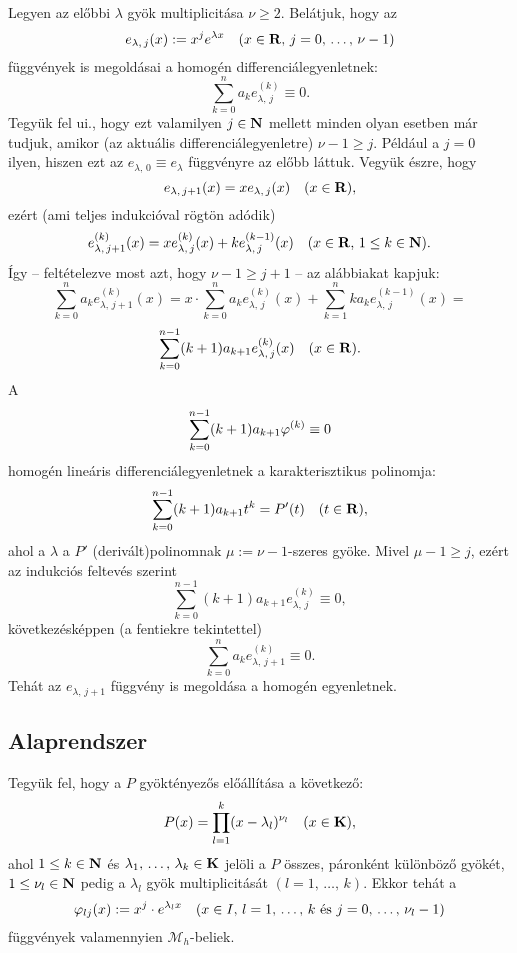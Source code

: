 Legyen az előbbi $\lambda$ gyök multiplicitása $\nu \geq 2$. Belátjuk, hogy az
\[
	e_{\lambda, \, j}(x) := x^j e^{\lambda x} \quad (x \in \mathbf{R}, \, j = 0, \, \dots, \, \nu - 1)
\]
függvények is megoldásai a homogén differenciálegyenletnek:
\[
	\sum_{k=0}^n a_k e_{\lambda, \, j}^{(k)} \equiv 0.
\]
Tegyük fel ui., hogy ezt valamilyen $j \in \mathbf{N}$ mellett minden olyan esetben már tudjuk, amikor (az aktuális differenciálegyenletre) $\nu - 1 \geq j$. Például a $j=0$ ilyen, hiszen ezt az $e_{\lambda, \, 0} \equiv e_\lambda$ függvényre az előbb láttuk. Vegyük észre, hogy
\[
	e_{\lambda, \, j+1}(x) = x e_{\lambda, \, j}(x) \quad (x \in \mathbf{R}),
\]
ezért (ami teljes indukcióval rögtön adódik)
\[
	e_{\lambda, \, j+1}^{(k)}(x) = x e_{\lambda, \, j}^{(k)}(x) + k e_{\lambda, \, j}^{(k-1)}(x) \quad (x \in \mathbf{R}, \, 1 \leq k \in \mathbf{N}).
\]
Így -- feltételezve most azt, hogy $\nu -1 \geq j + 1$ -- az alábbiakat kapjuk:
\[
	\sum_{k=0}^n a_k e_{\lambda, \, j+1}^{(k)}(x)  = x \cdot \sum_{k=0}^n a_k e_{\lambda, \, j}^{(k)}(x) + \sum_{k=1}^n k a_k e_{\lambda, \, j}^{(k-1)}(x) =
\]
\[
	\sum_{k=0}^{n-1} (k+1) a_{k+1} e_{\lambda, \, j}^{(k)}(x) \quad (x \in \mathbf{R}).
\]
A
\[
	\sum_{k=0}^{n-1} (k+1)a_{k+1} \varphi^{(k)} \equiv 0
\]
homogén lineáris differenciálegyenletnek a karakterisztikus polinomja:
\[
	\sum_{k=0}^{n-1} (k+1)a_{k+1} t^k = P'(t) \quad (t \in \mathbf{R}),
\]
ahol a $\lambda$ a $P'$ (derivált)polinomnak $\mu := \nu - 1$-szeres gyöke. Mivel $\mu - 1 \geq j$, ezért az indukciós feltevés szerint
\[
	\sum_{k=0}^{n-1}(k+1)a_{k+1}e_{\lambda, \, j}^{(k)} \equiv 0,
\]
következésképpen (a fentiekre tekintettel)
\[
	\sum_{k=0}^{n} a_k e_{\lambda, \, j+1}^{(k)} \equiv 0.
\]
Tehát az $e_{\lambda, \, j+1}$ függvény is megoldása a homogén egyenletnek.\\

\subsection{Alaprendszer}

Tegyük fel, hogy a $P$ gyöktényezős előállítása a következő:
\[
	P(x) = \prod_{l = 1}^k (x - \lambda_l)^{\nu_l} \quad (x \in \mathbf{K}),
\]
ahol $1 \leq k \in \mathbf{N}$ és $\lambda_1, \, \dots, \, \lambda_k \in \mathbf{K}$ jelöli a $P$ összes, páronként különböző gyökét, $1 \leq \nu_l \in \mathbf{N}$ pedig a $\lambda_l$ gyök multiplicitását $(l = 1, \, \dots, \, k)$. Ekkor tehát a
\[
	\varphi_{lj}(x) := x^j \cdot e^{\lambda_l x} \quad (x \in I, \, l = 1, \, \dots, \, k \text{ és } j = 0, \, \dots, \, \nu_l - 1)
\]
függvények valamennyien $\mathcal{M}_h$-beliek.\\

